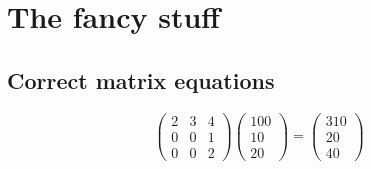 \documentclass{article}%
\begin{document}
%
\normalsize%
\section{The fancy stuff}%
\label{sec:Thefancystuff}%
\subsection{Correct matrix equations}%
\label{subsec:Correctmatrixequations}%
\[%
\begin{pmatrix}%
2&3&4\\%
0&0&1\\%
0&0&2%
\end{pmatrix} \begin{pmatrix}%
100\\%
10\\%
20%
\end{pmatrix} = \begin{pmatrix}%
310\\%
20\\%
40%
\end{pmatrix}%
\]

%
\end{document}
